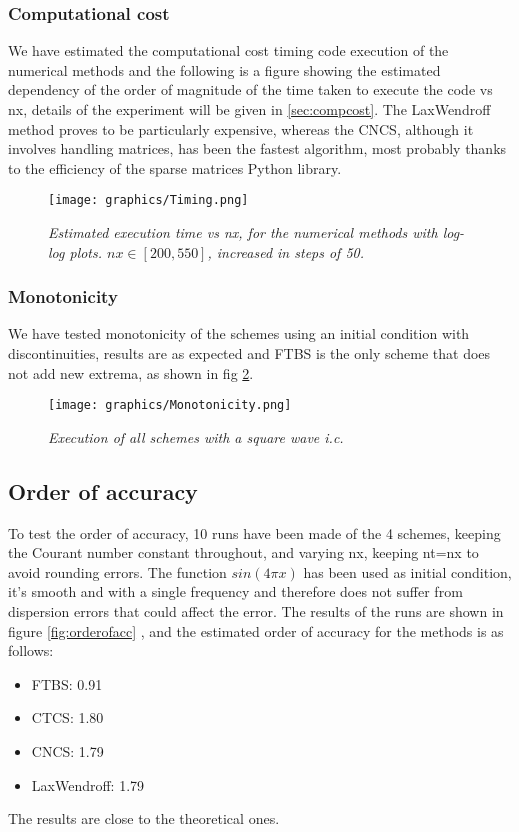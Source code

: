 \subsubsection{Computational cost}
We have estimated the computational cost timing code execution of the numerical methods and the following is a figure showing the estimated dependency of the order of magnitude of the time taken to execute the code vs nx, details of the experiment will be given in \ref{sec:compcost}. The LaxWendroff method proves to be particularly expensive, whereas the CNCS, although it involves handling matrices, has been the fastest algorithm, most probably thanks to the efficiency of the sparse matrices Python library.
\begin{figure}[H]
	\begin{center}
		\texttt{[image: graphics/Timing.png]}
	\end{center}%
	\caption[computational cost of numerical methods]{ \em Estimated execution time vs nx, for the numerical methods with log-log plots.  $nx\in [200, 550]$, increased in steps of 50.}
	\label{fig:timing}
\end{figure}

\subsubsection{Monotonicity}
We have tested monotonicity of the schemes using an initial condition with discontinuities, results are as expected and FTBS is the only scheme that does not add new extrema, as shown in fig \ref{fig:mono}.
\begin{figure}[H]
	\begin{center}
		\texttt{[image: graphics/Monotonicity.png]}
	\end{center}%
	\caption[Monotonicity]{ \em Execution of all schemes with a square wave i.c.}
	\label{fig:mono}
\end{figure}

\subsection{Order of accuracy}
To test the order of accuracy, 10 runs have been made of the 4 schemes, keeping the Courant number constant throughout, and varying nx, keeping nt=nx to avoid rounding errors. The function $sin(4\pi x)$ has been used as initial condition, it's smooth and with a single frequency and therefore does not suffer from dispersion errors that could affect the error.
The results of the runs are shown in figure \ref{fig:orderofacc} , and the estimated order of accuracy for the methods is as follows:
\begin{itemize}
\item FTBS: 0.91
\item CTCS: 1.80
\item CNCS: 1.79
\item LaxWendroff: 1.79
\end{itemize}
The results are close to the theoretical ones.

